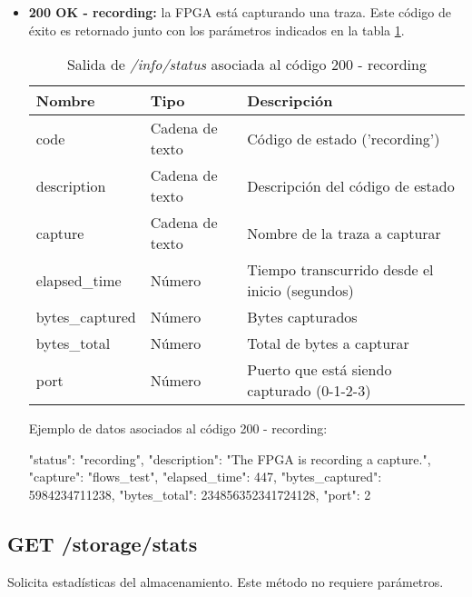 \begin{itemize}
\item{\textbf{200 OK - recording:} la \gls{FPGA} está capturando una \gls{traza}. Este código de éxito es retornado junto con los parámetros indicados en la tabla \ref{extra:api:infostatus:recording}.
\begin{table}[H]
\centering
\begin{tabular}{|l|l|l|}
\hline
\rowcolor[HTML]{F5F5F5}
\textbf{Nombre}  & \textbf{Tipo}   & \textbf{Descripción}                            \\ \hline
code             & Cadena de texto & Código de estado ('recording')                  \\ \hline
description      & Cadena de texto & Descripción del código de estado                \\ \hline
capture          & Cadena de texto & Nombre de la \gls{traza} a capturar             \\ \hline
elapsed\_time    & Número          & Tiempo transcurrido desde el inicio (segundos)  \\ \hline
bytes\_captured  & Número          & Bytes capturados                                \\ \hline
bytes\_total     & Número          & Total de bytes a capturar                       \\ \hline
port             & Número          & Puerto que está siendo capturado (0-1-2-3)      \\ \hline
\end{tabular}
\caption{Salida de \textit{/info/status} asociada al código 200 - recording}
\label{extra:api:infostatus:recording}
\end{table}
\begin{minipage}{\textwidth}
Ejemplo de datos asociados al código 200 - recording:

\begin{code}[language=json]
{
  "status": "recording",
  "description": "The FPGA is recording a capture.",
  "capture": "flows_test",
  "elapsed_time": 447,
  "bytes_captured": 5984234711238,
  "bytes_total": 234856352341724128,
  "port": 2
}
\end{code}
\end{minipage}
}

\end{itemize}

%
%
\subsection{GET /storage/stats}
Solicita estadísticas del almacenamiento. Este método no requiere parámetros.


